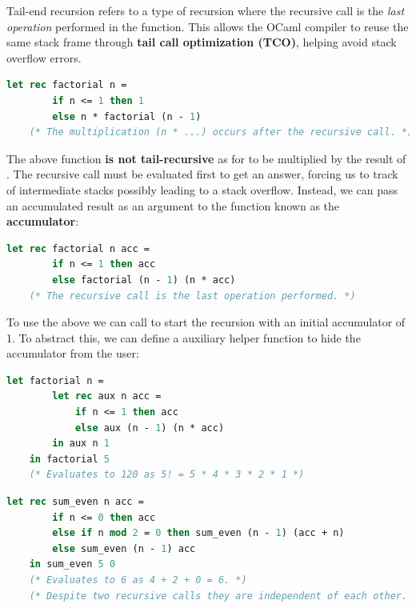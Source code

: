 \newpage

\begin{Def}

    Tail-end recursion refers to a type of recursion where the recursive call is the \emph{last operation} performed in the function. 
    This allows the OCaml compiler to reuse the same stack frame through \textbf{tail call optimization (TCO)}, helping avoid stack overflow errors.
    
    \begin{lstlisting}[language=OCaml, caption={Non-Tail-Recursive Factorial Function}, numbers=none]
    let rec factorial n =
        if n <= 1 then 1
        else n * factorial (n - 1)
    (* The multiplication (n * ...) occurs after the recursive call. *)
    \end{lstlisting}
    
    \noindent The above function \textbf{is not tail-recursive} as for  to be multiplied by the result of\\
    . The recursive call must be evaluated first to get an answer, forcing us to track of intermediate stacks possibly leading to a stack overflow.
    Instead, we can pass an accumulated result as an argument to the function known as the \textbf{accumulator}:
    
    \begin{lstlisting}[language=OCaml, caption={Tail-Recursive Factorial Function}, numbers=none]
    let rec factorial n acc =
        if n <= 1 then acc
        else factorial (n - 1) (n * acc)
    (* The recursive call is the last operation performed. *)
    \end{lstlisting}

    \noindent To use the above we can call  to start the recursion with an initial accumulator of 1.
    To abstract this, we can define a auxiliary helper function to hide the accumulator from the user:

    \begin{lstlisting}[language=OCaml, caption={Tail-Recursive Factorial Function with Helper}, numbers=none]
    let factorial n =
        let rec aux n acc =
            if n <= 1 then acc
            else aux (n - 1) (n * acc)
        in aux n 1
    in factorial 5
    (* Evaluates to 120 as 5! = 5 * 4 * 3 * 2 * 1 *)
    \end{lstlisting}

    \begin{lstlisting}[language=OCaml, caption={Tail-Recursive Summation of Positive Even Numbers}, numbers=none]
    let rec sum_even n acc =
        if n <= 0 then acc
        else if n mod 2 = 0 then sum_even (n - 1) (acc + n)
        else sum_even (n - 1) acc
    in sum_even 5 0
    (* Evaluates to 6 as 4 + 2 + 0 = 6. *)
    (* Despite two recursive calls they are independent of each other. *)
    \end{lstlisting}
        
\end{Def}

